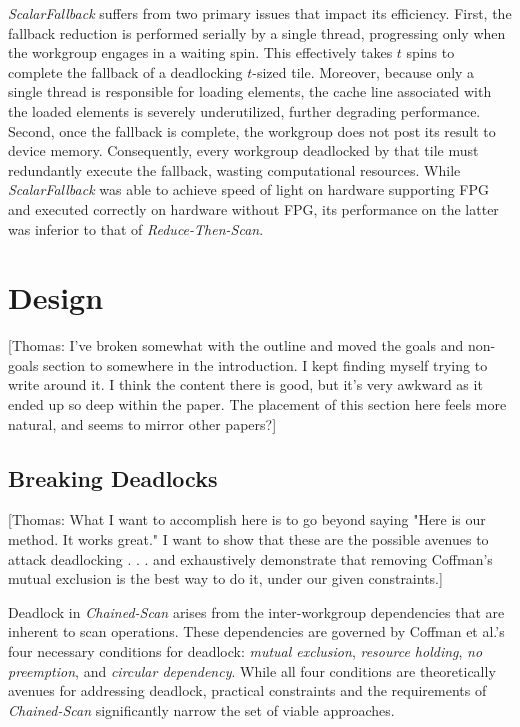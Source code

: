 \documentclass[sigconf]{acmart}
\newcommand{\thomas}[1]{{\footnotesize\color{orange}[Thomas: #1]}}
\begin{document}
\emph{ScalarFallback} suffers from two primary issues that impact its efficiency. First, the fallback reduction is performed serially by a single thread, progressing only when the workgroup engages in a waiting spin. This effectively takes $t$ spins to complete the fallback of a deadlocking $t$-sized tile. Moreover, because only a single thread is responsible for loading elements, the cache line associated with the loaded elements is severely underutilized, further degrading performance. Second, once the fallback is complete, the workgroup does not post its result to device memory. Consequently, every workgroup deadlocked by that tile must redundantly execute the fallback, wasting computational resources. While \emph{ScalarFallback} was able to achieve speed of light on hardware supporting FPG and executed correctly on hardware without FPG, its performance on the latter was inferior to that of \emph{Reduce-Then-Scan}.

\section{Design}
\thomas{I've broken somewhat with the outline and moved the goals and non-goals section to somewhere in the introduction. I kept finding myself trying to write around it. I think the content there is good, but it's very awkward as it ended up so deep within the paper. The placement of this section here feels more natural, and seems to mirror other papers?}

\subsection{Breaking Deadlocks}
\thomas{What I want to accomplish here is to go beyond saying "Here is our method. It works great." I want to show that these are the possible avenues to attack deadlocking . . . and exhaustively demonstrate that removing  Coffman's mutual exclusion is the best way to do it, under our given constraints.}

Deadlock in \emph{Chained-Scan} arises from the inter-workgroup dependencies that are inherent to scan operations. These dependencies are governed by Coffman et al.'s~\cite{10.1145/356586.356588} four necessary conditions for deadlock: \emph{mutual exclusion}, \emph{resource holding}, \emph{no preemption}, and \emph{circular dependency}. While all four conditions are theoretically avenues for addressing deadlock, practical constraints and the requirements of \emph{Chained-Scan} significantly narrow the set of viable approaches.
\end{document}
